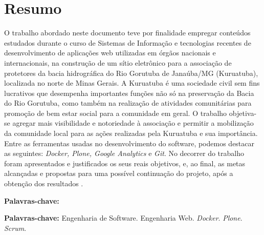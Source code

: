 \chapter*{Resumo}

\vspace{0.4cm}

\noindent O trabalho abordado neste documento teve por finalidade empregar conteúdos estudados durante o curso de Sistemas de Informação e tecnologias recentes de desenvolvimento de aplicações web utilizadas em órgãos nacionais e internacionais, na construção de um sítio eletrônico para a associação de protetores da bacia hidrográfica do Rio Gorutuba de Janaúba/MG (Kuruatuba), localizada no norte de Minas Gerais. A Kuruatuba é uma sociedade civil sem fins lucrativos que desempenha importantes funções não só na preservação da Bacia do Rio Gorutuba, como também na realização de atividades comunitárias para promoção de bem estar social para a comunidade em geral. O trabalho objetiva-se agregar mais visibilidade e notoriedade à associação e permitir a mobilização da comunidade local para as ações realizadas pela Kuruatuba e sua importância.   
Entre as ferramentas usadas no desenvolvimento do software, podemos destacar as seguintes: \textit{Docker, Plone, Google Analytics} e \textit{Git}.  
No decorrer do trabalho foram apresentados e justificados os seus reais objetivos, e, ao final, as metas alcançadas e propostas para uma possível continuação do projeto, após a obtenção dos resultados .

\begin{labeling}{\textbf{Palavras-chave:}}
\item[\textbf{Palavras-chave:}] 
Engenharia de Software.
Engenharia Web.
\textit{Docker}.
\textit{Plone}.
\textit{Scrum}.
\end{labeling}

